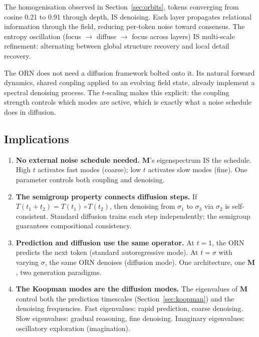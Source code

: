 \documentclass[11pt, a4paper]{article}
\newcommand{\M}{\mathbf{M}}
\theoremstyle{plain}
\theoremstyle{remark}
\begin{document}
The homogenisation observed in Section~\ref{sec:orbits}, tokens converging from cosine 0.21 to 0.91 through depth, IS denoising.
Each layer propagates relational information through the field, reducing per-token noise toward consensus.
The entropy oscillation (focus $\to$ diffuse $\to$ focus across layers) IS multi-scale refinement: alternating between global structure recovery and local detail recovery.

The ORN does not need a diffusion framework bolted onto it.
Its natural forward dynamics, shared coupling applied to an evolving field state, already implement a spectral denoising process.
The $t$-scaling makes this explicit: the coupling strength controls which modes are active, which is exactly what a noise schedule does in diffusion.

\subsection{Implications}

\begin{enumerate}[nosep]
    \item \textbf{No external noise schedule needed.}  $\M$'s eigenspectrum IS the schedule.  High $t$ activates fast modes (coarse); low $t$ activates slow modes (fine).  One parameter controls both coupling and denoising.

    \item \textbf{The semigroup property connects diffusion steps.}  If $T(t_1 + t_2) = T(t_1) \circ T(t_2)$, then denoising from $\sigma_1$ to $\sigma_3$ via $\sigma_2$ is self-consistent.  Standard diffusion trains each step independently; the semigroup guarantees compositional consistency.

    \item \textbf{Prediction and diffusion use the same operator.}  At $t{=}1$, the ORN predicts the next token (standard autoregressive mode).  At $t{=}\sigma$ with varying $\sigma$, the same ORN denoises (diffusion mode).  One architecture, one $\M$, two generation paradigms.

    \item \textbf{The Koopman modes are the diffusion modes.}  The eigenvalues of $\M$ control both the prediction timescales (Section~\ref{sec:koopman}) and the denoising frequencies.  Fast eigenvalues: rapid prediction, coarse denoising.  Slow eigenvalues: gradual reasoning, fine denoising.  Imaginary eigenvalues: oscillatory exploration (imagination).
\end{enumerate}
\end{document}
